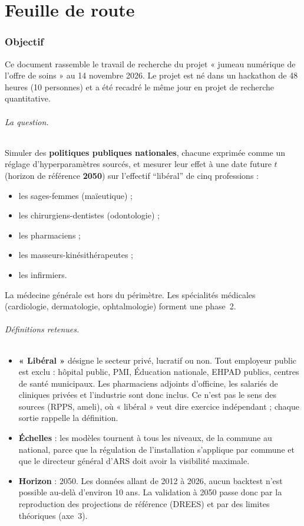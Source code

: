 \part{Feuille de route}

\section{Objectif}
\label{syn-objectif}
Ce document rassemble le travail de recherche du projet « jumeau numérique de l'offre de soins »
au 14 novembre 2026. Le projet est né dans un hackathon de 48 heures (10 personnes) et a été
recadré le même jour en projet de recherche quantitative.

\paragraph{La question.} Simuler des \textbf{politiques publiques nationales}, chacune exprimée
comme un réglage d'hyperparamètres sourcés, et mesurer leur effet à une date future $t$
(horizon de référence \textbf{2050}) sur l'effectif \enquote{libéral} de cinq professions :
\begin{itemize}
  \item les sages-femmes (maïeutique) ;
  \item les chirurgiens-dentistes (odontologie) ;
  \item les pharmaciens ;
  \item les masseurs-kinésithérapeutes ;
  \item les infirmiers.
\end{itemize}
La médecine générale est hors du périmètre. Les spécialités médicales (cardiologie,
dermatologie, ophtalmologie) forment une phase~2.

\paragraph{Définitions retenues.}
\begin{itemize}
  \item \textbf{« Libéral »} désigne le secteur privé, lucratif ou non. Tout employeur public
        est exclu : hôpital public, PMI, Éducation nationale, EHPAD publics, centres de santé
        municipaux. Les pharmaciens adjoints d'officine, les salariés de cliniques privées et
        l'industrie sont donc inclus. Ce n'est pas le sens des sources (RPPS, ameli), où
        « libéral » veut dire exercice indépendant ; chaque sortie rappelle la définition.
  \item \textbf{Échelles} : les modèles tournent à tous les niveaux, de la commune au national,
        parce que la régulation de l'installation s'applique par commune et que le directeur
        général d'ARS doit avoir la visibilité maximale.
  \item \textbf{Horizon} : 2050. Les données allant de 2012 à 2026, aucun backtest n'est
        possible au-delà d'environ 10 ans. La validation à 2050 passe donc par la
        reproduction des projections de référence (DREES) et par des limites théoriques
        (axe~3).
\end{itemize}

